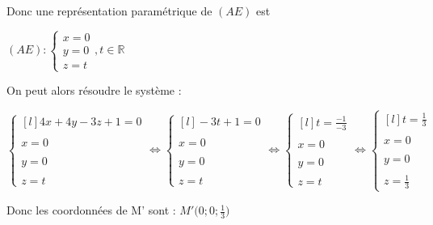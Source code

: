 \documentclass{article}
\begin{document}
\vspace{2mm}
\noindent Donc une représentation paramétrique de $(AE)$ est
\vspace{2mm}

$(AE):\left\{\begin{matrix}
x = 0\\
y = 0\\
z = t
\end{matrix}
\right., t \in \mathbb{R}
$

\vspace{2mm}
\noindent On peut alors résoudre le système : 

$\left\{\begin{matrix*}[l]
   4x+4y-3z+1=0\\
   \\
   x = 0\\
   \\
   y = 0\\
   \\
   z = t
\end{matrix*}\right.
\Leftrightarrow
\left\{\begin{matrix*}[l]
   -3t+1=0\\
   \\
   x = 0\\
   \\
   y = 0\\
   \\
   z = t
\end{matrix*}\right.
\Leftrightarrow
\left\{\begin{matrix*}[l]
   t = \displaystyle\frac{-1}{-3}\\
   \\
   x = 0\\
   \\
   y = 0\\
   \\
   z = t
\end{matrix*}\right.
\Leftrightarrow
\left\{\begin{matrix*}[l]
   t = \displaystyle\frac{1}{3}\\
   \\
   x = 0\\
   \\
   y = 0\\
   \\
   z = \displaystyle\frac{1}{3}
\end{matrix*}\right.
$

\noindent Donc les coordonnées de M' sont :  $M'\Bigg(0; 0; \displaystyle\frac{1}{3}\Bigg)$
\end{document}

